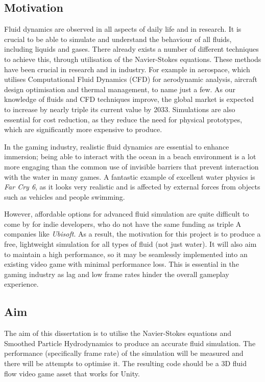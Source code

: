 \documentclass[12pt]{article}
\begin{document}
    \subsection{Motivation}
    Fluid dynamics are observed in all aspects of daily life and in research. It is crucial to be able to simulate and understand the behaviour of all fluids, including liquids and gases. There already exists a number of different techniques to achieve this, through utilisation of the Navier-Stokes equations. These methods have been crucial in research and in industry. For example in aerospace, which utilises Computational Fluid Dynamics (CFD) for aerodynamic analysis, aircraft design optimisation and thermal management, to name just a few. As our knowledge of fluids and CFD techniques improve, the global market is expected to increase by nearly triple its current value by 2033\cite{market}. Simulations are also essential for cost reduction, as they reduce the need for physical prototypes, which are significantly more expensive to produce.

    In the gaming industry, realistic fluid dynamics are essential to enhance immersion; being able to interact with the ocean in a beach environment is a lot more engaging than the common use of invisible barriers that prevent interaction with the water in many games. A fantastic example of excellent water physics is \textit{Far Cry 6}\cite{farcry6}, as it looks very realistic and is affected by external forces from objects such as vehicles and people swimming.
    
    However, affordable options for advanced fluid simulation are quite difficult to come by for indie developers, who do not have the same funding as triple A companies like \textit{Ubisoft}. As a result, the motivation for this project is to produce a free, lightweight simulation for all types of fluid (not just water). It will also aim to maintain a high performance, so it may be seamlessly implemented into an existing video game with minimal performance loss. This is essential in the gaming industry as lag and low frame rates hinder the overall gameplay experience.

    \subsection{Aim}
    The aim of this dissertation is to utilise the Navier-Stokes equations and Smoothed Particle Hydrodynamics to produce an accurate fluid simulation. The performance (specifically frame rate) of the simulation will be measured and there will be attempts to optimise it. The resulting code should be a 3D fluid flow video game asset that works for Unity.
\end{document}
